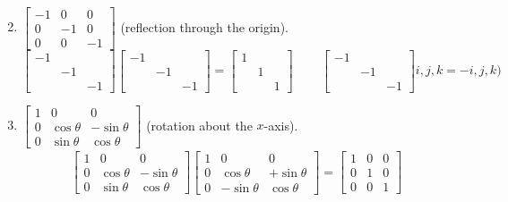 \documentclass[twoside]{amsart}
\theoremstyle{plain}
\theoremstyle{definition}
\begin{document}
\begin{enumerate}
\[\begin{aligned}
\end{aligned}
\]
\item $\left[ \begin{matrix} -1 & 0 & 0 \\ 0 & -1 & 0 \\ 0 & 0 & -1 \end{matrix} \right]$ (reflection through the origin).  
  \[
  \left[ \begin{matrix} -1 & & \\ & -1 & \\ & & -1 \end{matrix} \right] \left[ \begin{matrix} -1 & & \\ & -1 & \\ & & - 1 \end{matrix} \right] = \left[ \begin{matrix} 1 & & \\ & 1 & \\ & & 1 \end{matrix} \right] \quad \quad \, \left[ \begin{matrix} -1 & & \\ & -1 & \\ & & -1 \end{matrix} \right] i,j,k = -i,j,k)
\]
\item $\left[ \begin{matrix} 1 & 0 & 0 \\ 0 & \cos{\theta} & -\sin{\theta} \\ 0 & \sin{\theta} & \cos{\theta} \end{matrix} \right]$ (rotation about the $x$-axis).  
\[
\begin{gathered}
  \left[ \begin{matrix} 1 & 0 & 0 \\ 0 & \cos{\theta} & - \sin{\theta} \\ 0 & \sin{\theta} & \cos{\theta} \end{matrix} \right] \left[ \begin{matrix} 1 & 0 & 0 \\ 0 & \cos{\theta} & + \sin{\theta} \\ 0 & -\sin{ \theta} & \cos{\theta} \end{matrix} \right] = \left[ \begin{matrix} 1 & 0 & 0 \\  0 & 1 & 0 \\ 0 & 0 & 1 \end{matrix} \right] \\

\end{gathered}\]
\end{enumerate}
\end{document}
